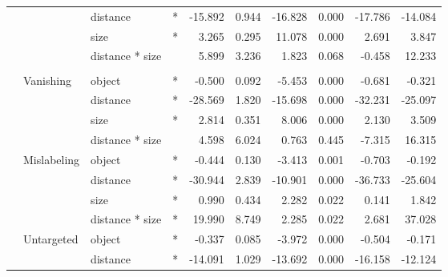 \documentclass[
]{article}
\begin{document}
\begin{longtable}[t]{llllrrrrrr}
\cmidrule{3-10}\nopagebreak
\hspace{1em} &  & distance & * & -15.892 & 0.944 & -16.828 & 0.000 & -17.786 & -14.084\\
\cmidrule{3-10}\nopagebreak
\hspace{1em} &  & size & * & 3.265 & 0.295 & 11.078 & 0.000 & 2.691 & 3.847\\
\cmidrule{3-10}\nopagebreak
\hspace{1em} &  & distance * size &  & 5.899 & 3.236 & 1.823 & 0.068 & -0.458 & 12.233\\
\cmidrule{1-10}\pagebreak[0]
\addlinespace[0.3em]
\multicolumn{10}{l}{\textbf{RetinaNet}}\\
\hspace{1em} & Vanishing & object & * & -0.500 & 0.092 & -5.453 & 0.000 & -0.681 & -0.321\\
\cmidrule{3-10}\nopagebreak
\hspace{1em} &  & distance & * & -28.569 & 1.820 & -15.698 & 0.000 & -32.231 & -25.097\\
\cmidrule{3-10}\nopagebreak
\hspace{1em} &  & size & * & 2.814 & 0.351 & 8.006 & 0.000 & 2.130 & 3.509\\
\cmidrule{3-10}\nopagebreak
\hspace{1em} &  & distance * size &  & 4.598 & 6.024 & 0.763 & 0.445 & -7.315 & 16.315\\
\cmidrule{2-10}\nopagebreak
\hspace{1em} & Mislabeling & object & * & -0.444 & 0.130 & -3.413 & 0.001 & -0.703 & -0.192\\
\cmidrule{3-10}\nopagebreak
\hspace{1em} &  & distance & * & -30.944 & 2.839 & -10.901 & 0.000 & -36.733 & -25.604\\
\cmidrule{3-10}\nopagebreak
\hspace{1em} &  & size & * & 0.990 & 0.434 & 2.282 & 0.022 & 0.141 & 1.842\\
\cmidrule{3-10}\nopagebreak
\hspace{1em} &  & distance * size & * & 19.990 & 8.749 & 2.285 & 0.022 & 2.681 & 37.028\\
\cmidrule{2-10}\nopagebreak
\hspace{1em} & Untargeted & object & * & -0.337 & 0.085 & -3.972 & 0.000 & -0.504 & -0.171\\
\cmidrule{3-10}\nopagebreak
\hspace{1em} &  & distance & * & -14.091 & 1.029 & -13.692 & 0.000 & -16.158 & -12.124\\

\end{longtable}
\end{document}
